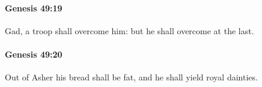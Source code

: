 		\paragraph{Genesis 49:19} %
			\label{GENESIS-49-19}

			Gad, a troop shall overcome him: but he shall overcome at the last.


		\paragraph{Genesis 49:20} %
			\label{GENESIS-49-20}

			Out of Asher his bread shall be fat, and he shall yield royal dainties.


